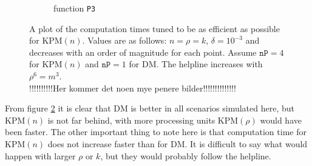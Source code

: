 \begin{figure}[H]
\begin{subfigure}[b]{0.45\textwidth}
                \caption{function \texttt{P3}}
                \label{fig:c2comp2m}
        \end{subfigure}
%        
        \caption{A plot of the computation times tuned to be as efficient as possible for KPM$(n)$. Values are as follows: $n = \rho = k$, $\delta = 10^{-3}$ and decreases with an order of magnitude for each point. Assume $\texttt{nP} = 4$ for KPM$(n)$ and $\texttt{nP} = 1$ for DM. The helpline increases with $\rho^6 = m^3$.\\!!!!!!!!!!Her kommer det noen mye penere bilder!!!!!!!!!!!!!!}\label{fig:comp}
        
\end{figure}
From figure \ref{fig:comp} it is clear that DM is better in all scenarios simulated here, but KPM$(n)$ is not far behind, with more processing units KPM$(\rho)$ would have been faster. The other important thing to note here is that computation time for KPM$(n)$ does not increase faster than for DM. It is difficult to say what would happen with larger $\rho$ or $k$, but they would probably follow the helpline.

